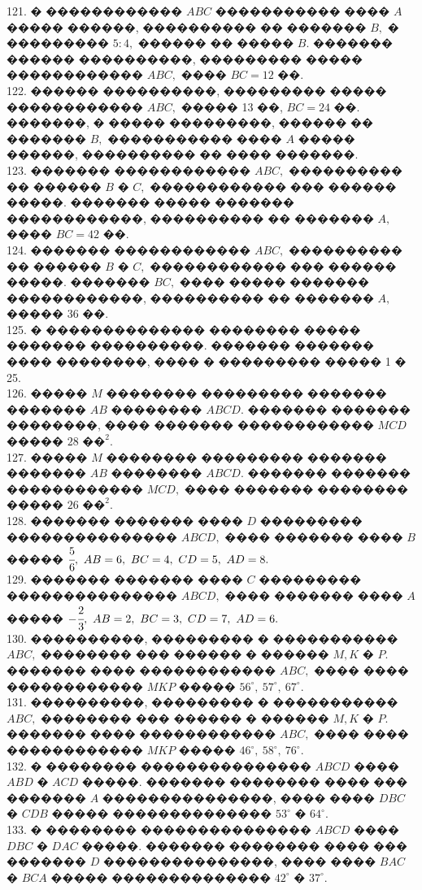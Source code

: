 \documentclass[12pt]{article}
\begin{document}
121. � ������������ $ABC$ ����������� ���� $A$ ����� ������, ���������� �� ������� $B,$ � ��������� $5:4,$ ������ �� ����� $B.$ ������� ������ ����������, ��������� ����� ������������ $ABC,$ ���� $BC=12$ ��.\\
122. ������ ����������, ��������� ����� ������������ $ABC,$ ����� 13 ��, $BC=24$ ��. �������, � ����� ���������, ������ �� ������� $B,$ ����������� ���� $A$ ����� ������, ���������� �� ���� �������.\\
123. ������� ������������ $ABC,$ ���������� �� ������ $B$ � $C,$ ������������ ��� ������ �����. ������� ����� ������� ������������, ���������� �� ������� $A,$ ���� $BC=42$ ��.\\
124. ������� ������������ $ABC,$ ���������� �� ������ $B$ � $C,$ ������������ ��� ������ �����. ������� $BC,$ ���� ����� ������� ������������, ���������� �� ������� $A,$ ����� 36 ��.\\
125. � �������������� �������� ����� ������� ����������. ������� ������� ���� ��������, ���� � ��������� ����� 1 � 25.\\
126. ����� $M$ �������� ��������� ������� ������� $AB$ �������� $ABCD.$ ������� ������� ��������, ���� ������� ������������ $MCD$ ����� $28\text{ ��}^2.$\\
127. ����� $M$ �������� ��������� ������� ������� $AB$ �������� $ABCD.$ ������� ������� ������������ $MCD,$ ���� �������  �������� ����� $26\text{ ��}^2.$\\
128. ������� ������� ���� $D$ ��������� ��������������� $ABCD,$ ���� ������� ���� $B$ ����� $\cfrac{5}{6},\ AB=6,\ BC=4,\ CD=5,\ AD=8.$\\
129. ������� ������� ���� $C$ ��������� ��������������� $ABCD,$ ���� ������� ���� $A$ ����� $-\cfrac{2}{3},\ AB=2,\ BC=3,\ CD=7,\ AD=6.$\\
130. ����������, ��������� � ����������� $ABC,$ �������� ��� ������ � ������ $M, K$ � $P.$ ������� ���� ������������ $ABC,$ ���� ���� ������������ $MKP$ ����� $56^\circ,\ 57^\circ,\ 67^\circ.$\\
131. ����������, ��������� � ����������� $ABC,$ �������� ��� ������ � ������ $M, K$ � $P.$ ������� ���� ������������ $ABC,$ ���� ���� ������������ $MKP$ ����� $46^\circ,\ 58^\circ,\ 76^\circ.$\\
132. � �������� ��������������� $ABCD$ ���� $ABD$ � $ACD$ �����. ������� �������� ���� ��� ������� $A$ ���������������, ���� ���� $DBC$ � $CDB$ ����� �������������� $53^\circ$ � $64^\circ.$\\
133. � �������� ��������������� $ABCD$ ���� $DBC$ � $DAC$ �����. ������� �������� ���� ��� ������� $D$ ���������������, ���� ���� $BAC$ � $BCA$ ����� �������������� $42^\circ$ � $37^\circ.$\\
\end{document}
